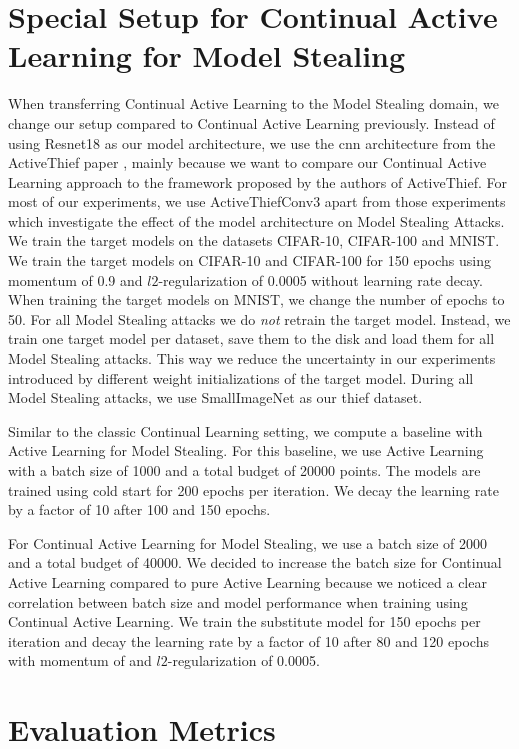\section{Special Setup for Continual Active Learning for Model Stealing}
\label{sec:Methodology:CALMSsetup}
When transferring Continual Active Learning to the Model Stealing domain, we change our setup compared to Continual Active Learning previously. Instead of using Resnet18 as our
model architecture, we use the \gls{cnn} architecture from the ActiveThief paper \cite{pal2020activethief}, mainly because we want to compare our Continual Active Learning approach to
the framework proposed by the authors of ActiveThief. For most of our experiments, we use ActiveThiefConv3 apart from those experiments which investigate the effect of the model 
architecture on Model Stealing Attacks. We train the target models on the datasets CIFAR-10, CIFAR-100 and MNIST. We train the target models on CIFAR-10 and CIFAR-100 for
150 epochs using momentum of 0.9 and $l2$-regularization of 0.0005 without learning rate decay. When training the target models on MNIST, we change the number of epochs to 50.
For all Model Stealing attacks we do \textit{not} retrain the target model. Instead, we train one target model per dataset, save them to the disk and load them for all Model Stealing
attacks. This way we reduce the uncertainty in our experiments introduced by different weight initializations of the target model. During all Model Stealing attacks, we use SmallImageNet
as our thief dataset. \par
Similar to the classic Continual Learning setting, we compute a baseline with Active Learning for Model Stealing. For this baseline, we use Active Learning with a batch size of 1000
and a total budget of 20000 points. The models are trained using cold start for 200 epochs per iteration. We decay the learning rate by a factor of 10 after 100 and 150 epochs. \par
For Continual Active Learning for Model Stealing, we use a batch size of 2000 and a total budget of 40000. We decided to increase the batch size for Continual Active Learning compared
to pure Active Learning because we noticed a clear correlation between batch size and model performance when training using Continual Active Learning. We train the substitute model for
150 epochs per iteration and decay the learning rate by a factor of 10 after 80 and 120 epochs with momentum of and $l2$-regularization of 0.0005.

\section{Evaluation Metrics}
\label{sec:Methodology:Metrics}

